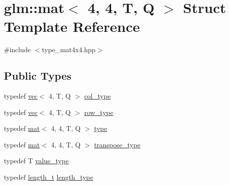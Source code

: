 \hypertarget{structglm_1_1mat_3_014_00_014_00_01_t_00_01_q_01_4}{}\section{glm\+:\+:mat$<$ 4, 4, T, Q $>$ Struct Template Reference}
\label{structglm_1_1mat_3_014_00_014_00_01_t_00_01_q_01_4}


{\ttfamily \#include $<$type\+\_\+mat4x4.\+hpp$>$}

\subsection*{Public Types}
\begin{DoxyCompactItemize}
\item 
typedef \hyperlink{structglm_1_1vec}{vec}$<$ 4, T, Q $>$ \hyperlink{structglm_1_1mat_3_014_00_014_00_01_t_00_01_q_01_4_aad430dc291d0156d573c434be7fdecc1}{col\+\_\+type}
\item 
typedef \hyperlink{structglm_1_1vec}{vec}$<$ 4, T, Q $>$ \hyperlink{structglm_1_1mat_3_014_00_014_00_01_t_00_01_q_01_4_a2f05ded6544c98508d5f29e498d2e4dd}{row\+\_\+type}
\item 
typedef \hyperlink{structglm_1_1mat}{mat}$<$ 4, 4, T, Q $>$ \hyperlink{structglm_1_1mat_3_014_00_014_00_01_t_00_01_q_01_4_a2151b2f14fc2ccf6e39a0ca3182270c2}{type}
\item 
typedef \hyperlink{structglm_1_1mat}{mat}$<$ 4, 4, T, Q $>$ \hyperlink{structglm_1_1mat_3_014_00_014_00_01_t_00_01_q_01_4_aae643ca23a5e538e908086e5149f500f}{transpose\+\_\+type}
\item 
typedef T \hyperlink{structglm_1_1mat_3_014_00_014_00_01_t_00_01_q_01_4_ae564877d4d3802415244ba1c83cc4c89}{value\+\_\+type}
\item 
typedef \hyperlink{namespaceglm_a090a0de2260835bee80e71a702492ed9}{length\+\_\+t} \hyperlink{structglm_1_1mat_3_014_00_014_00_01_t_00_01_q_01_4_ae06c2957874bbff5701b304668b5cb01}{length\+\_\+type}
\end{DoxyCompactItemize}
